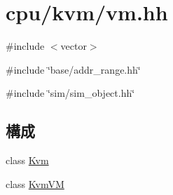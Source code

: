 \hypertarget{vm_8hh}{
\section{cpu/kvm/vm.hh}
\label{vm_8hh}
}
{\ttfamily \#include $<$vector$>$}\par
{\ttfamily \#include \char`\"{}base/addr\_\-range.hh\char`\"{}}\par
{\ttfamily \#include \char`\"{}sim/sim\_\-object.hh\char`\"{}}\par
\subsection*{構成}
\begin{DoxyCompactItemize}
\item 
class \hyperlink{classKvm}{Kvm}
\item 
class \hyperlink{classKvmVM}{KvmVM}
\end{DoxyCompactItemize}
